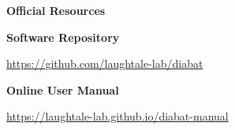 \clearpage
\thispagestyle{plain}
\vspace*{2.3cm}
\begin{center}
{\LARGE\bfseries Official Resources}\par\vspace{1.9cm}
{\large\bfseries Software Repository}\par\vspace{0.3cm}
\url{https://github.com/laughtale-lab/diabat}\par\vspace{1.6cm}
{\large\bfseries Online User Manual}\par\vspace{0.3cm}
\url{https://laughtale-lab.github.io/diabat-manual}\par\vspace{0.35cm}
\end{center}\clearpage
